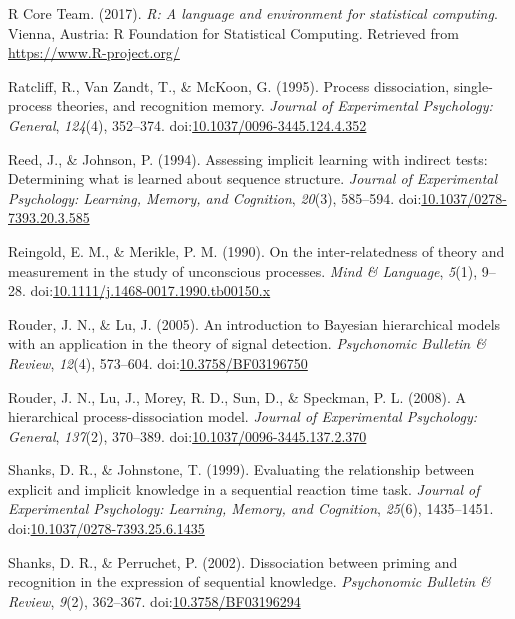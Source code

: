 \documentclass[jou]{apa6}
\theoremstyle{definition}
\theoremstyle{definition}
\theoremstyle{definition}
\theoremstyle{remark}
\begin{document}
\hypertarget{ref-R-base}{}
R Core Team. (2017). \emph{R: A language and environment for statistical
computing}. Vienna, Austria: R Foundation for Statistical Computing.
Retrieved from \url{https://www.R-project.org/}

\hypertarget{ref-ratcliff_process_1995}{}
Ratcliff, R., Van Zandt, T., \& McKoon, G. (1995). Process dissociation,
single-process theories, and recognition memory. \emph{Journal of
Experimental Psychology: General}, \emph{124}(4), 352--374.
doi:\href{https://doi.org/10.1037/0096-3445.124.4.352}{10.1037/0096-3445.124.4.352}

\hypertarget{ref-reed_assessing_1994}{}
Reed, J., \& Johnson, P. (1994). Assessing implicit learning with
indirect tests: Determining what is learned about sequence structure.
\emph{Journal of Experimental Psychology: Learning, Memory, and
Cognition}, \emph{20}(3), 585--594.
doi:\href{https://doi.org/10.1037/0278-7393.20.3.585}{10.1037/0278-7393.20.3.585}

\hypertarget{ref-reingold_inter-relatedness_1990}{}
Reingold, E. M., \& Merikle, P. M. (1990). On the inter-relatedness of
theory and measurement in the study of unconscious processes. \emph{Mind
\& Language}, \emph{5}(1), 9--28.
doi:\href{https://doi.org/10.1111/j.1468-0017.1990.tb00150.x}{10.1111/j.1468-0017.1990.tb00150.x}

\hypertarget{ref-rouder_introduction_2005}{}
Rouder, J. N., \& Lu, J. (2005). An introduction to Bayesian
hierarchical models with an application in the theory of signal
detection. \emph{Psychonomic Bulletin \& Review}, \emph{12}(4),
573--604.
doi:\href{https://doi.org/10.3758/BF03196750}{10.3758/BF03196750}

\hypertarget{ref-rouder_hierarchical_2008}{}
Rouder, J. N., Lu, J., Morey, R. D., Sun, D., \& Speckman, P. L. (2008).
A hierarchical process-dissociation model. \emph{Journal of Experimental
Psychology: General}, \emph{137}(2), 370--389.
doi:\href{https://doi.org/10.1037/0096-3445.137.2.370}{10.1037/0096-3445.137.2.370}

\hypertarget{ref-shanks_evaluating_1999}{}
Shanks, D. R., \& Johnstone, T. (1999). Evaluating the relationship
between explicit and implicit knowledge in a sequential reaction time
task. \emph{Journal of Experimental Psychology: Learning, Memory, and
Cognition}, \emph{25}(6), 1435--1451.
doi:\href{https://doi.org/10.1037/0278-7393.25.6.1435}{10.1037/0278-7393.25.6.1435}

\hypertarget{ref-shanks_dissociation_2002}{}
Shanks, D. R., \& Perruchet, P. (2002). Dissociation between priming and
recognition in the expression of sequential knowledge. \emph{Psychonomic
Bulletin \& Review}, \emph{9}(2), 362--367.
doi:\href{https://doi.org/10.3758/BF03196294}{10.3758/BF03196294}
\end{document}
